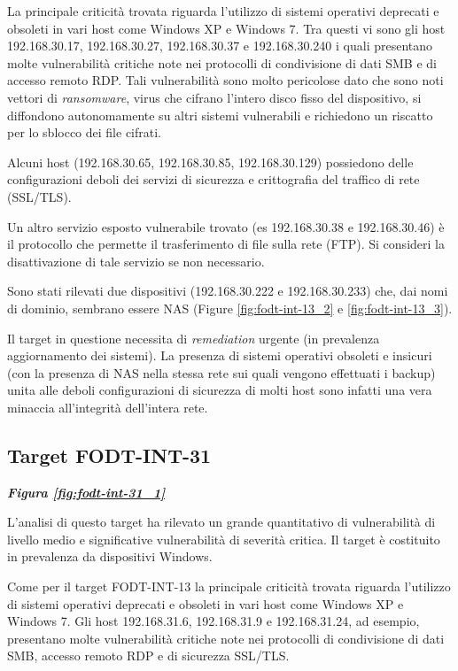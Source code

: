 \documentclass[target=bach,aauheader=]{thud}
\begin{document}
La principale criticità trovata riguarda l’utilizzo di sistemi operativi deprecati e obsoleti in vari host come Windows XP e Windows 7.
Tra questi vi sono gli host 192.168.30.17, 192.168.30.27, 192.168.30.37 e 192.168.30.240 i quali presentano molte vulnerabilità critiche note nei protocolli di condivisione di dati SMB e di accesso remoto RDP. Tali vulnerabilità sono molto pericolose dato che sono noti vettori di \textit{ransomware}, virus che cifrano l’intero disco fisso del dispositivo, si diffondono autonomamente su altri sistemi vulnerabili e richiedono un riscatto per lo sblocco dei file cifrati.

Alcuni host (192.168.30.65, 192.168.30.85, 192.168.30.129) possiedono delle configurazioni deboli dei servizi di sicurezza e crittografia del traffico di rete (SSL/TLS).

Un altro servizio esposto vulnerabile trovato (es 192.168.30.38 e 192.168.30.46) è il protocollo che permette il trasferimento di file sulla rete (FTP). Si consideri la disattivazione di tale servizio se non necessario.

Sono stati rilevati due dispositivi (192.168.30.222 e 192.168.30.233) che, dai nomi di dominio, sembrano essere NAS (Figure \ref{fig:fodt-int-13_2} e \ref{fig:fodt-int-13_3}).

Il target in questione necessita di \textit{remediation} urgente (in prevalenza aggiornamento dei sistemi). La presenza di sistemi operativi obsoleti e insicuri (con la presenza di NAS nella stessa rete sui quali vengono effettuati i backup) unita alle deboli configurazioni di sicurezza di molti host sono infatti una vera minaccia all’integrità dell’intera rete.

\subsection{Target FODT-INT-31} \textbf{\textit{Figura \ref{fig:fodt-int-31_1}}}

L’analisi di questo target ha rilevato un grande quantitativo di vulnerabilità di livello medio e significative vulnerabilità di severità critica. Il target è costituito in prevalenza da dispositivi Windows.

Come per il target FODT-INT-13 la principale criticità trovata riguarda l’utilizzo di sistemi operativi deprecati e obsoleti in vari host come Windows XP e Windows 7.
Gli host 192.168.31.6, 192.168.31.9 e 192.168.31.24, ad esempio, presentano molte vulnerabilità critiche note nei protocolli di condivisione di dati SMB, accesso remoto RDP e di sicurezza SSL/TLS.
\end{document}
